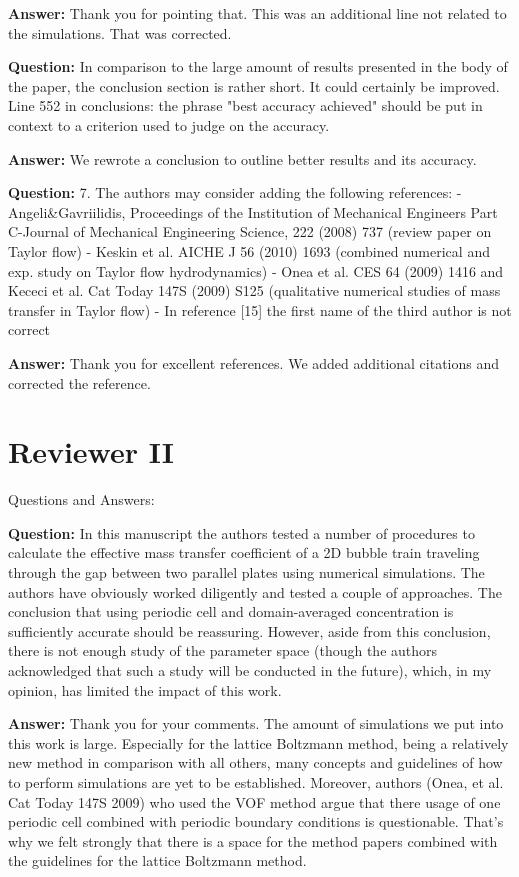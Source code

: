 \documentclass{article}
\begin{document}
\textbf{Answer:} Thank you for pointing that. This was an additional line not related to the simulations. That was corrected.

\textbf{Question:} In comparison to the large amount of results presented in the body of the paper, the conclusion section is rather short. It could certainly be improved. Line 552 in conclusions: the phrase "best accuracy achieved" should be put in context to a criterion used to judge on the accuracy.

\textbf{Answer:} We rewrote a conclusion to outline better results and its accuracy.

\textbf{Question:} 7. The authors may consider adding the following references:
- Angeli\&Gavriilidis, Proceedings of the Institution of Mechanical Engineers Part C-Journal of Mechanical Engineering Science, 222 (2008) 737 (review paper on Taylor flow)
- Keskin et al. AICHE J 56 (2010) 1693 (combined numerical and exp. study on Taylor flow hydrodynamics)
- Onea et al. CES 64 (2009) 1416 and Kececi et al. Cat Today 147S (2009) S125 (qualitative numerical studies of mass transfer in Taylor flow)
- In reference [15] the first name of the third author is not correct

\textbf{Answer:} Thank you for excellent references. We added additional citations and corrected the reference.

\section{Reviewer II}
Questions and Answers:

\textbf{Question:} In this manuscript the authors tested a number of procedures to calculate the effective mass transfer coefficient of a 2D bubble train traveling through the gap between two parallel plates using numerical simulations. The authors have obviously worked diligently and tested a couple of approaches. The conclusion that using periodic cell and domain-averaged concentration is sufficiently accurate should be reassuring. However, aside from this conclusion, there is not enough study of the parameter space (though the authors acknowledged that such a study will be conducted in the future), which, in my opinion, has limited the impact of this work.

\textbf{Answer:}  Thank you for your comments. The amount of simulations we put into this work is large. Especially for the lattice Boltzmann method, being a relatively new method in comparison with all others, many concepts and guidelines of how to perform simulations are yet to be established. Moreover, authors (Onea, et al. Cat Today 147S 2009) who used the VOF method argue that there usage of one periodic cell combined with periodic boundary conditions is questionable. That's why we felt strongly that there is a space for the method papers combined with the guidelines for the lattice Boltzmann method.   
 
\end{document}
